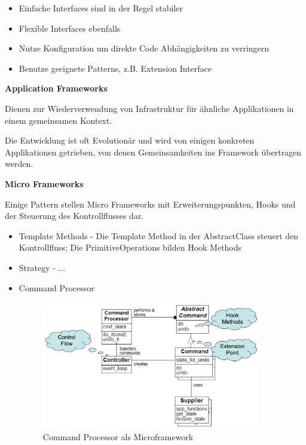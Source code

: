 \begin{itemize}
	\item Einfache Interfaces sind in der Regel stabiler
	\item Flexible Interfaces ebenfalls
	\item Nutze Konfiguration um direkte Code Abhängigkeiten zu verringern
	\item Benutze geeignete Patterns, z.B. Extension Interface
\end{itemize}

\textbf{Application Frameworks}

Dienen zur Wiederverwendung von Infrastruktur für ähnliche Applikationen in einem gemeinsamen Kontext.

Die Entwicklung ist oft Evolutionär und wird von einigen konkreten Applikationen getrieben, von denen Gemeinsamkeiten ins Framework übertragen werden.

\textbf{Micro Frameworks}

Einige Pattern stellen Micro Frameworks mit Erweiterungspunkten, Hooks und der Steuerung des Kontrollflusses dar.

\begin{itemize}
	\item Template Methods - Die Template Method in der AbstractClass steuert den Kontrollfluss; Die PrimitiveOperations bilden Hook Methods
	\item Strategy - ...
	\item Command Processor

	\begin{figure}[H]
		\centering
		\includegraphics[width=0.9\textwidth]{content/frameworks/commandprocessormicroframework.png}
		\caption{Command Processor als Microframework}
	\end{figure}
\end{itemize}
